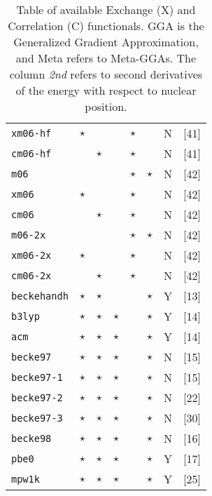 \begin{table}[htp]
{\begin{tabular}{|l|p{0.12cm}p{0.12cm}cccp{0.35cm}|c|}
{\tt  xm06-hf  }& $\star$  &             &       &$\star$&       &  N   &[41]\\
{\tt  cm06-hf  }&          & $\star$     &       &$\star$&       &  N   &[41]\\
{\tt  m06      }&          &             &       &$\star$&$\star$&  N   &[42]\\
{\tt  xm06     }& $\star$  &             &       &$\star$&       &  N   &[42]\\
{\tt  cm06     }&          & $\star$     &       &$\star$&       &  N   &[42]\\
{\tt  m06-2x   }&          &             &       &$\star$&$\star$&  N   &[42]\\
{\tt  xm06-2x  }& $\star$  &             &       &$\star$&       &  N   &[42]\\
{\tt  cm06-2x  }&          & $\star$     &       &$\star$&       &  N   &[42]\\
\hline
{\tt  beckehandh}& $\star$  &   $\star$   &           &   & $\star$  &  Y   &[13]\\
{\tt  b3lyp    }& $\star$  &   $\star$   &  $\star$  &   & $\star$  &  Y   &[14]\\
{\tt  acm      }& $\star$  &   $\star$   &  $\star$  &   & $\star$  &  Y   &[14]\\
{\tt  becke97  }& $\star$  &   $\star$   &  $\star$  &   & $\star$  &  N   &[15]\\
{\tt  becke97-1}& $\star$  &   $\star$   &  $\star$  &   & $\star$  &  N   &[15]\\
{\tt  becke97-2}& $\star$  &   $\star$   &  $\star$  &   & $\star$  &  N   &[22]\\
{\tt  becke97-3}& $\star$  &   $\star$   &  $\star$  &   & $\star$  &  N   &[30]\\
{\tt  becke98  }& $\star$  &   $\star$   &  $\star$  &   & $\star$  &  N   &[16]\\
{\tt  pbe0     }& $\star$  &   $\star$   &  $\star$  &   & $\star$  &  Y   &[17]\\
{\tt  mpw1k    }& $\star$  &   $\star$   &  $\star$  &   & $\star$  &  Y   &[25]\\
\hline
\end{tabular}
\caption{Table of available Exchange (X) and Correlation (C) functionals.
GGA is the Generalized Gradient Approximation, and Meta refers to Meta-GGAs.
The column {\em 2nd} refers to second derivatives of the
energy with respect to nuclear position. }
\label{tablexc}
}
\end{table}



